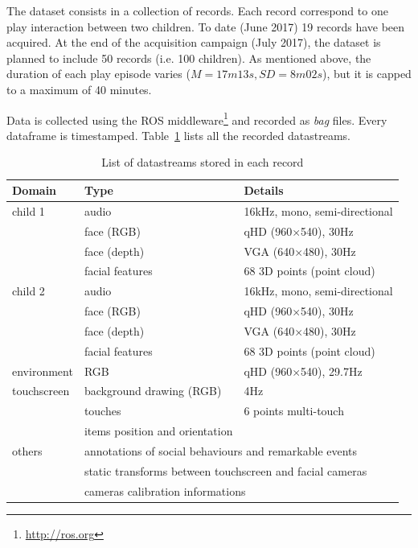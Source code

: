 \documentclass{article}
\newcommand{\ie}{i.e.\xspace}
\begin{document}
The dataset consists in a collection of records. Each record correspond to one
play interaction between two children. To date (June 2017) 19 records have been acquired. At the end of the acquisition campaign
(July 2017), the dataset is planned to include 50 records (\ie 100 children). As
mentioned above, the duration of each play episode varies ($M=17m13s,
SD=8m02s$), but it is capped to a maximum of 40 minutes.


Data is collected using the ROS middleware\footnote{\url{http://ros.org}} and
recorded as \emph{bag} files. Every dataframe is timestamped.
Table~\ref{table|datastreams} lists all the recorded datastreams.

\begin{table}[]
\centering
\caption{List of datastreams stored in each record}
\label{table|datastreams}
\begin{tabular}{@{}lll@{}}
\toprule
\bf Domain  & \bf Type                              & \bf Details                          \\ \midrule
child 1     & audio                                 & 16kHz, mono, semi-directional        \\
            & face (RGB)                            & qHD (960$\times$540), 30Hz           \\
            & face (depth)                          & VGA (640$\times$480), 30Hz           \\
            & facial features                       & 68 3D points (point cloud)           \\ \midrule
child 2     & audio                                 & 16kHz, mono, semi-directional        \\
            & face (RGB)                            & qHD (960$\times$540), 30Hz           \\
            & face (depth)                          & VGA (640$\times$480), 30Hz           \\
            & facial features                       & 68 3D points (point cloud)           \\ \midrule
environment & RGB                                   & qHD (960$\times$540), 29.7Hz         \\ \midrule
touchscreen & background drawing (RGB)              & 4Hz                                  \\
            & touches                               & 6 points multi-touch                 \\
            & items position and orientation        &                                      \\ \midrule
others      & \multicolumn{2}{l}{annotations of social behaviours and remarkable events}   \\
            & \multicolumn{2}{l}{static transforms between touchscreen and facial cameras} \\
            & \multicolumn{2}{l}{cameras calibration informations}                         \\ \bottomrule
\end{tabular}
\end{table}
\end{document}
